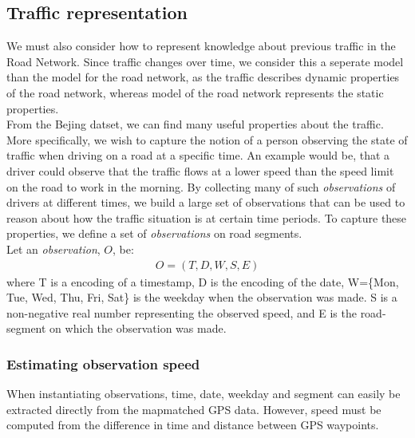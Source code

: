 \subsection{Traffic representation}\label{KR:traffic}
We must also consider how to represent knowledge about previous traffic in the Road Network. Since traffic changes over time, we consider this a seperate model than the model for the road network, as the traffic describes dynamic properties of the road network, whereas model of the road network represents the static properties.\\
From the Bejing datset, we can find many useful properties about the traffic. More specifically, we wish to capture the notion of a person observing the state of traffic when driving on a road at a specific time. An example would be, that a driver could observe that the traffic flows at a lower speed than the speed limit on the road to work in the morning. By collecting many of such \emph{observations} of drivers at different times, we build a large set of observations that can be used to reason about how the traffic situation is at certain time periods. To capture these properties, we define a set of \emph{observations} on road segments.\\
Let an \emph{observation}, $O$, be:
\begin{align*}
O = (T, D, W, S, E)
\end{align*}
where T is a encoding of a timestamp, D is the encoding of the date, W=\{Mon, Tue, Wed, Thu, Fri, Sat\} is the weekday when the observation was made. S is a non-negative real number representing the observed speed, and E is the road-segment on which the observation was made.\\

\subsubsection{Estimating observation speed}\label{KR:speed}
When instantiating observations, time, date, weekday and segment can easily be extracted directly from the mapmatched GPS data. However, speed must be computed from the difference in time and distance between GPS waypoints.

